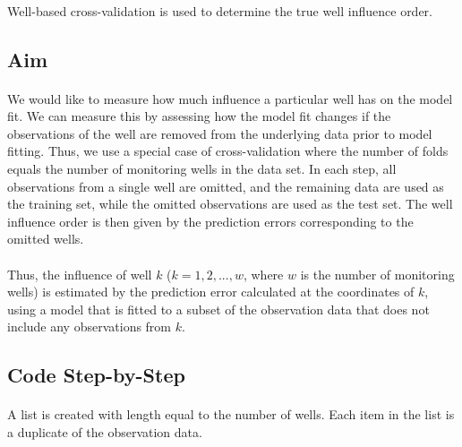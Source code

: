 \documentclass{article}
\begin{document}
\paragraph{}

Well-based cross-validation is used to determine the true well influence order.

\subsection{Aim}
\paragraph{}

We would like to measure how much influence a particular well has on the model fit. We can measure this by assessing how the model fit changes if the observations of the well are removed from the underlying data prior to model fitting. Thus, we use a special case of cross-validation \parencite{cross-validation} where the number of folds equals the number of monitoring wells in the data set. In each step, all observations from a single well are omitted, and the remaining data are used as the training set, while the omitted observations are used as the test set. The well influence order is then given by the prediction errors corresponding to the omitted wells. 

\paragraph{}

Thus, the influence of well $k$ ($k=1,2,...,w$, where $w$ is the number of monitoring wells) is estimated by the prediction error calculated at the coordinates of $k$, using a model that is fitted to a subset of the observation data that does not include any observations from $k$.

\subsection{Code Step-by-Step}
\paragraph{}

A list is created with length equal to the number of wells. Each item in the list is a duplicate of the observation data. 

\paragraph{}
\end{document}
